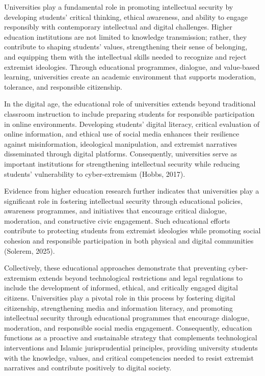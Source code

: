 \documentclass[10pt]{NSP1}
\begin{document}
\par\medskip{}\smallskip

Universities play a fundamental role in promoting intellectual security by developing students' critical thinking, ethical awareness, and ability to engage responsibly with contemporary intellectual and digital challenges. Higher education institutions are not limited to knowledge transmission; rather, they contribute to shaping students' values, strengthening their sense of belonging, and equipping them with the intellectual skills needed to recognize and reject extremist ideologies. Through educational programmes, dialogue, and value-based learning, universities create an academic environment that supports moderation, tolerance, and responsible citizenship.

In the digital age, the educational role of universities extends beyond traditional classroom instruction to include preparing students for responsible participation in online environments. Developing students' digital literacy, critical evaluation of online information, and ethical use of social media enhances their resilience against misinformation, ideological manipulation, and extremist narratives disseminated through digital platforms. Consequently, universities serve as important institutions for strengthening intellectual security while reducing students' vulnerability to cyber-extremism (Hobbs, 2017).

Evidence from higher education research further indicates that universities play a significant role in fostering intellectual security through educational policies, awareness programmes, and initiatives that encourage critical dialogue, moderation, and constructive civic engagement. Such educational efforts contribute to protecting students from extremist ideologies while promoting social cohesion and responsible participation in both physical and digital communities (Solerem, 2025).

Collectively, these educational approaches demonstrate that preventing cyber-extremism extends beyond technological restrictions and legal regulations to include the development of informed, ethical, and critically engaged digital citizens. Universities play a pivotal role in this process by fostering digital citizenship, strengthening media and information literacy, and promoting intellectual security through educational programmes that encourage dialogue, moderation, and responsible social media engagement. Consequently, education functions as a proactive and sustainable strategy that complements technological interventions and Islamic jurisprudential principles, providing university students with the knowledge, values, and critical competencies needed to resist extremist narratives and contribute positively to digital society.
\end{document}
